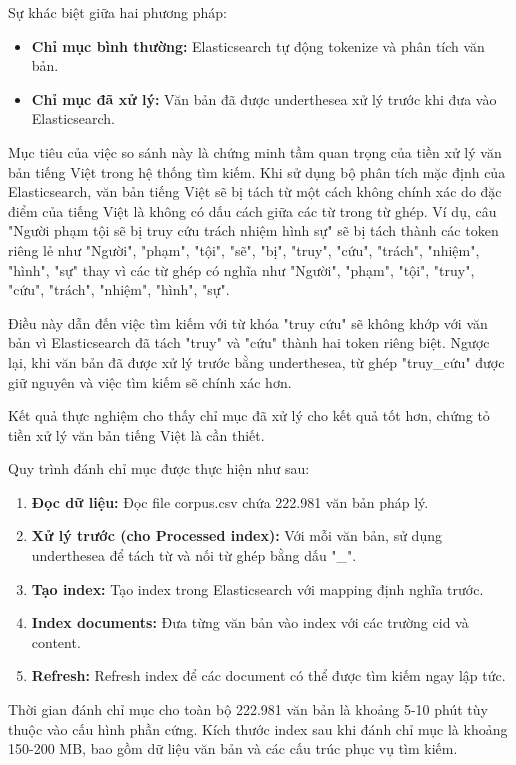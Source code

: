 \documentclass[../BTL.tex]{subfiles}
\begin{document}
Sự khác biệt giữa hai phương pháp:
\begin{itemize}
    \item \textbf{Chỉ mục bình thường:} Elasticsearch tự động tokenize và phân tích văn bản.
    \item \textbf{Chỉ mục đã xử lý:} Văn bản đã được underthesea xử lý trước khi đưa vào Elasticsearch.
\end{itemize}

Mục tiêu của việc so sánh này là chứng minh tầm quan trọng của tiền xử lý văn bản tiếng Việt trong hệ thống tìm kiếm. Khi sử dụng bộ phân tích mặc định của Elasticsearch, văn bản tiếng Việt sẽ bị tách từ một cách không chính xác do đặc điểm của tiếng Việt là không có dấu cách giữa các từ trong từ ghép. Ví dụ, câu "Người phạm tội sẽ bị truy cứu trách nhiệm hình sự" sẽ bị tách thành các token riêng lẻ như "Người", "phạm", "tội", "sẽ", "bị", "truy", "cứu", "trách", "nhiệm", "hình", "sự" thay vì các từ ghép có nghĩa như "Người", "phạm", "tội", "truy", "cứu", "trách", "nhiệm", "hình", "sự".

Điều này dẫn đến việc tìm kiếm với từ khóa "truy cứu" sẽ không khớp với văn bản vì Elasticsearch đã tách "truy" và "cứu" thành hai token riêng biệt. Ngược lại, khi văn bản đã được xử lý trước bằng underthesea, từ ghép "truy\_cứu" được giữ nguyên và việc tìm kiếm sẽ chính xác hơn.

Kết quả thực nghiệm cho thấy chỉ mục đã xử lý cho kết quả tốt hơn, chứng tỏ tiền xử lý văn bản tiếng Việt là cần thiết.

Quy trình đánh chỉ mục được thực hiện như sau:

\begin{enumerate}
    \item \textbf{Đọc dữ liệu:} Đọc file corpus.csv chứa 222.981 văn bản pháp lý.
    \item \textbf{Xử lý trước (cho Processed index):} Với mỗi văn bản, sử dụng underthesea để tách từ và nối từ ghép bằng dấu "\_".
    \item \textbf{Tạo index:} Tạo index trong Elasticsearch với mapping định nghĩa trước.
    \item \textbf{Index documents:} Đưa từng văn bản vào index với các trường cid và content.
    \item \textbf{Refresh:} Refresh index để các document có thể được tìm kiếm ngay lập tức.
\end{enumerate}

Thời gian đánh chỉ mục cho toàn bộ 222.981 văn bản là khoảng 5-10 phút tùy thuộc vào cấu hình phần cứng. Kích thước index sau khi đánh chỉ mục là khoảng 150-200 MB, bao gồm dữ liệu văn bản và các cấu trúc phục vụ tìm kiếm.
\end{document}
